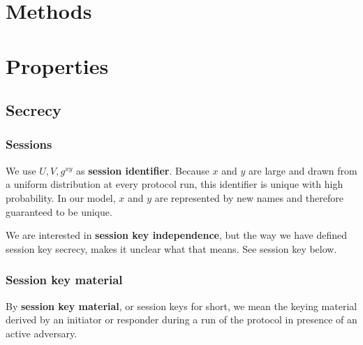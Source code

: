 \section{Methods}
\section{Properties}
\subsection{Secrecy}
\subsubsection{Sessions}
\label{sec:mail-notes-secrecy-sessions}
%
We use $U, V, g^{xy}$ as \textbf{session identifier}.
%
Because $x$ and $y$ are large and drawn from a uniform distribution at every
protocol run, this identifier is unique with high probability.
%
In our model, $x$ and $y$ are represented by new names and therefore guaranteed
to be unique.
%
%


We are interested in \textbf{session key independence}, but
the way we have defined session key secrecy, makes it unclear what that means.
%
See session key below.
%

\subsubsection{Session key material}
\label{sec:mail-notes-session-key-mtrl}
%
By \textbf{session key material}, or session keys for short,  we mean the
keying material derived by an initiator or responder during a run of the
protocol in presence of an active adversary.
%

